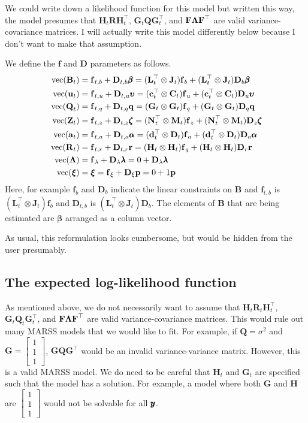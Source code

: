 \documentclass[]{article}
\def\uupsilon{\pmb{\upsilon}}
\def\llambda{\pmb{\lambda}}
\def\bbeta{\pmb{\beta}}
\def\aalpha{\pmb{\alpha}}
\def\zzeta{\pmb{\zeta}}
\def\xixi{\mbox{\boldmath $\xi$}}
\def\PI{\mbox{\boldmath $\Pi$}}
\def\LAM{\mbox{\boldmath $\Lambda$}}
\def\UPS{\mbox{\boldmath $\Upsilon$}}
\def\XI{\mbox{\boldmath $\Xi$}}
\def\Ab{\mbox{$\mathbf D$}} \def\Aa{\mbox{$\mathbf d$}} \def\Am{\PI}
\def\BB{\mbox{$\mathbf B$}}	\def\bb{\mbox{$\mathbf b$}} \def\Bb{\mbox{$\mathbf J$}} \def\Ba{\mbox{$\mathbf L$}} \def\Bm{\UPS}
\def\DD{\mbox{$\mathbf D$}}	\def\dd{\mbox{$\mathbf d$}}
\def\FF{\mbox{$\mathbf F$}} \def\ff{\mbox{$\mathbf f$}}
\def\GG{\mbox{$\mathbf G$}}	\def\gg{\mbox{$\mathbf g$}}
\def\HH{\mbox{$\mathbf H$}}	\def\hh{\mbox{$\mathbf h$}}
\def\QQ{\mbox{$\mathbf Q$}}	 \def\qq{\mbox{$\mathbf q$}} \def\Qb{\mbox{$\mathbf G$}}  \def\Qm{\mathbb{Q}}
\def\RR{\mbox{$\mathbf R$}}	 \def\rr{\mbox{$\mathbf r$}} \def\Rb{\mbox{$\mathbf H$}}	\def\Rm{\mathbb{R}}
\def\Ub{\mbox{$\mathbf C$}} \def\Ua{\mbox{$\mathbf c$}} \def\Um{\UPS}
\def\ZZ{\mbox{$\mathbf Z$}}	\def\zz{\mbox{$\mathbf z$}}	\def\Zb{\mbox{$\mathbf M$}} \def\Za{\mbox{$\mathbf N$}} \def\Zm{\XI}
\def\vec{\,\textup{\textrm{vec}}}
\begin{document}
We could write down a likelihood function for this model but written this way, the model presumes that $\Rb_t\RR\Rb_t^\top$, $\Qb_t\QQ\Qb_t^\top$, and $\FF\LAM\FF^\top$ are valid variance-covariance matrices.  I will actually write this model differently below because I don't want to make that assumption.

We define the $\ff$ and $\DD$ parameters as follows.
\begin{equation*}
\begin{split}
\vec(\BB_t) &= \ff_{t,b} + \DD_{t,b}\bbeta = (\Ba_t^\top \otimes \Bb_t)\ff_b + (\Ba_t^\top \otimes \Bb_t)\DD_b\bbeta\\
\vec(\uu_t) &= \ff_{t,u} + \DD_{t,u}\uupsilon = (\Ua_t^\top \otimes \Ub_t)\ff_u + (\Ua_t^\top \otimes \Ub_t)\DD_u\uupsilon\\
\vec(\QQ_t) &= \ff_{t,q} + \DD_{t,q}\qq = (\Qb_t \otimes \Qb_t)\ff_q + (\Qb_t \otimes \Qb_t)\DD_q\qq \\
\vec(\ZZ_t) &= \ff_{t,z} + \DD_{t,z}\zzeta = (\Za_t^\top \otimes \Zb_t)\ff_z + (\Za_t^\top \otimes \Zb_t)\DD_z\zzeta\\
\vec(\aa_t) &= \ff_{t,a} + \DD_{t,a}\aalpha = (\Aa_t^\top \otimes \Ab_t)\ff_a + (\Aa_t^\top \otimes \Ab_t)\DD_a\aalpha\\
\vec(\RR_t) &= \ff_{t,r} + \DD_{t,r}\rr = (\Rb_t \otimes \Rb_t)\ff_q + (\Rb_t \otimes \Rb_t)\DD_r\rr\\
\vec(\LAM)&= \ff_\lambda+\DD_\lambda\llambda = 0 + \DD_\lambda\llambda\\
\vec(\xixi)&= \xixi=\ff_\xi+\DD_\xi\pp = 0+1\pp
\end{split}
\end{equation*}
Here, for example $\ff_b$ and $\DD_b$ indicate the linear constraints on $\BB$ and $\ff_{t,b}$ is $(\Ba_t^\top \otimes \Bb_t)\ff_b$ and $\DD_{t,b}$ is $(\Ba_t^\top \otimes \Bb_t)\DD_b$.  The elements of $\BB$ that are being estimated are $\bbeta$ arranged as a column vector.

As usual, this reformulation looks cumbersome, but would be hidden from the user presumably.

\subsection{The expected log-likelihood function}
As mentioned above, we do not necessarily want to assume that $\HH_t\RR_t\HH_t^\top$, $\GG_t\QQ_t\GG_t^\top$, and $\FF\LAM\FF^\top$ are valid variance-covariance matrices.  This would rule out many MARSS models that we would like to fit.  For example, if $\QQ=\sigma^2$ and $\GG=\begin{bmatrix}1\\ 1\\ 1\end{bmatrix}$,  $\GG\QQ\GG^\top$ would be an invalid variance-variance matrix.  However, this is a valid MARSS model. We do need to be careful that $\HH_t$ and $\GG_t$ are specified such that the model has a solution.  For example, a model where both $\GG$ and $\HH$ are $\begin{bmatrix}1\\ 1\\ 1\end{bmatrix}$ would not be solvable for all $\mbox{$\pmb{y}$}$.
\end{document}
